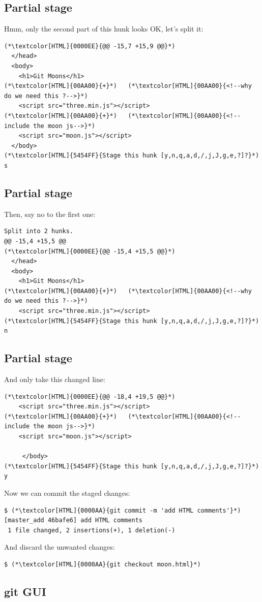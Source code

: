 \subsection{Partial stage}
\begin{frame}[fragile]
  \subslidetitle
  Hmm, only the second part of this hunk looks OK, let's split it:
  \begin{lstlisting}
(*\textcolor[HTML]{0000EE}{@@ -15,7 +15,9 @@}*)
  </head>
  <body>
    <h1>Git Moons</h1>
(*\textcolor[HTML]{00AA00}{+}*)   (*\textcolor[HTML]{00AA00}{<!--why do we need this ?-->}*)
    <script src="three.min.js"></script>
(*\textcolor[HTML]{00AA00}{+}*)   (*\textcolor[HTML]{00AA00}{<!--include the moon js-->}*)
    <script src="moon.js"></script>
  </body>
(*\textcolor[HTML]{5454FF}{Stage this hunk [y,n,q,a,d,/,j,J,g,e,?]?}*) s
\end{lstlisting}
\end{frame}

\subsection{Partial stage}
\begin{frame}[fragile]
  \subslidetitle

  Then, say no to the first one:
  \begin{lstlisting}
Split into 2 hunks.
@@ -15,4 +15,5 @@
(*\textcolor[HTML]{0000EE}{@@ -15,4 +15,5 @@}*)
  </head>
  <body>
    <h1>Git Moons</h1>
(*\textcolor[HTML]{00AA00}{+}*)   (*\textcolor[HTML]{00AA00}{<!--why do we need this ?-->}*)
    <script src="three.min.js"></script>
(*\textcolor[HTML]{5454FF}{Stage this hunk [y,n,q,a,d,/,j,J,g,e,?]?}*) n
\end{lstlisting}
\end{frame}

\subsection{Partial stage}
\begin{frame}[fragile]
  \subslidetitle
  And only take this changed line:
  \begin{lstlisting}
(*\textcolor[HTML]{0000EE}{@@ -18,4 +19,5 @@}*)
    <script src="three.min.js"></script>
(*\textcolor[HTML]{00AA00}{+}*)   (*\textcolor[HTML]{00AA00}{<!--include the moon js-->}*)
    <script src="moon.js"></script>

     </body>
(*\textcolor[HTML]{5454FF}{Stage this hunk [y,n,q,a,d,/,j,J,g,e,?]?}*) y
\end{lstlisting}

  Now we can commit the staged changes:
  \begin{lstlisting}
$ (*\textcolor[HTML]{0000AA}{git commit -m 'add HTML comments'}*)
[master_add 46bafe6] add HTML comments
 1 file changed, 2 insertions(+), 1 deletion(-)
\end{lstlisting}

  And discard the unwanted changes:
  \begin{lstlisting}
$ (*\textcolor[HTML]{0000AA}{git checkout moon.html}*)
\end{lstlisting}
\end{frame}

\subsection{git GUI}
\begin{frame}[fragile]
  \subslidetitle
\end{frame}

